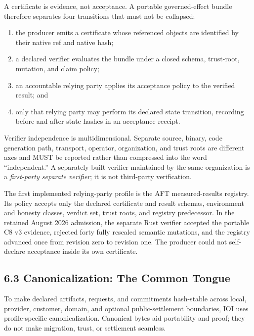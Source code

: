 \documentclass[
  11pt,
]{article}
\providecommand{\tightlist}{%
  \setlength{\itemsep}{0pt}\setlength{\parskip}{0pt}}
\begin{document}
A certificate is evidence, not acceptance. A portable governed-effect bundle
therefore separates four transitions that must not be collapsed:

\begin{enumerate}
\def\labelenumi{\arabic{enumi}.}
\tightlist
\item
  the producer emits a certificate whose referenced objects are identified by
  their native ref and native hash;
\item
  a declared verifier evaluates the bundle under a closed schema, trust-root,
  mutation, and claim policy;
\item
  an accountable relying party applies its acceptance policy to the verified
  result; and
\item
  only that relying party may perform its declared state transition, recording
  before and after state hashes in an acceptance receipt.
\end{enumerate}

Verifier independence is multidimensional. Separate source, binary, code
generation path, transport, operator, organization, and trust roots are
different axes and MUST be reported rather than compressed into the word
``independent.'' A separately built verifier maintained by the same
organization is a \emph{first-party separate verifier}; it is not third-party
verification.

The first implemented relying-party profile is the AFT measured-results
registry. Its policy accepts only the declared certificate and result schemas,
environment and honesty classes, verdict set, trust roots, and registry
predecessor. In the retained August 2026 admission, the separate Rust verifier
accepted the portable C8 v3 evidence, rejected forty fully resealed semantic
mutations, and the registry advanced once from revision zero to revision one.
The producer could not self-declare acceptance inside its own certificate.

\hypertarget{canonicalization-the-common-tongue}{%
\subsection{6.3 Canonicalization: The Common
Tongue}\label{canonicalization-the-common-tongue}}

To make declared artifacts, requests, and commitments hash-stable across local,
provider, customer, domain, and optional public-settlement boundaries, IOI uses
profile-specific canonicalization. Canonical bytes aid portability and proof;
they do not make migration, trust, or settlement seamless.\\
\end{document}
